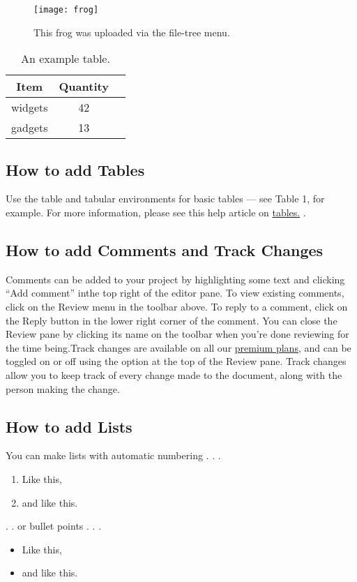 \documentclass{article}
\begin{document}
    
    \begin{figure}
    	\centering
   	\texttt{[image: frog]}
    \caption{This frog was uploaded via the file-tree menu.}
    	\label{fig:This frog was uploaded via the file-tree menu.}
    \end{figure}
	\begin{table}
	\centering
	\begin{tabular}{c |c c}
 		
 		Item &Quantity\\
 		\hline
 		
 		widgets&42\\
 		gadgets &13\\
 		
  \end{tabular}
   \caption{An example table.}
	\end{table}
 \subsection{ How to add Tables}
Use the table and tabular environments for basic tables — see Table 1, for example. For more information, please see this help article on \href{https://www.overleaf.com/learn/latex/tables}{tables.} .
                       
\subsection{How to add Comments and Track Changes}
 Comments can be added to your project by highlighting some text and clicking “Add comment” inthe top right of the editor pane. To view existing comments, click on the Review menu in the toolbar above. To reply to a comment, click on the Reply button in the lower right corner of the comment.
You can close the Review pane by clicking its name on the toolbar when you’re done reviewing for the time being.Track changes are available on all our \href{https://www.overleaf.com/user/subscription/plans}{premium plans}, and can be toggled on or off using the option at the top of the Review pane. Track changes allow you to keep track of every change made to the document, along with the person making the change.
                       
\subsection{  How to add Lists}

You can make lists with automatic numbering . . .
  \begin{enumerate}
  	\item Like this,
  	\item and like this.
  \end{enumerate}
. . or bullet points . . .
\begin{itemize}
	\item Like this,
	\item and like this.
\end{itemize}
\end{document}
